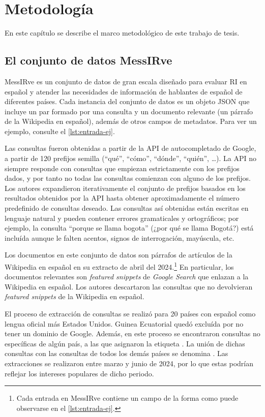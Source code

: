 \chapter{Metodología}\label{cap:metodologia}

En este capítulo se describe el marco metodológico de este trabajo de tesis.

\section{El conjunto de datos MessIRve}\label{sec:metodologia-dataset}
MessIRve \parencite{messirve-ValentiniEtAl2025} es un conjunto de datos de gran escala diseñado para evaluar RI en español y atender las necesidades de información de hablantes de español de diferentes países. Cada instancia del conjunto de datos es un objeto JSON que incluye un par formado por una consulta y un documento relevante (un párrafo de la Wikipedia en español), además de otros campos de metadatos. Para ver un ejemplo, consulte el \cref{lst:entrada-ej}.

Las consultas fueron obtenidas a partir de la API de autocompletado de Google, a partir de 120 prefijos semilla (``qué'', ``cómo'', ``dónde'', ``quién'', \ldots). La API no siempre responde con consultas que empiezan estrictamente con los prefijos dados, y por tanto no todas las consultas comienzan con alguno de los prefijos. Los autores expandieron iterativamente el conjunto de prefijos basados en los resultados obtenidos por la API hasta obtener aproximadamente el número predefinido de consultas deseado. Las consultas así obtenidas están escritas en lenguaje natural y pueden contener errores gramaticales y ortográficos; por ejemplo, la consulta ``porque se llama bogota'' (¿por qué se llama Bogotá?) está incluída aunque le falten acentos, signos de interrogación, mayúscula, etc.

Los documentos en este conjunto de datos son párrafos de artículos de la Wikipedia en español en su extracto de abril del 2024.\footnote{Cada entrada en MessIRve contiene un campo  de la forma  como puede observarse en el \cref{lst:entrada-ej}.} En particular, los documentos relevantes son \textit{featured snippets} de \textit{Google Search} que enlazan a la Wikipedia en español. Los autores descartaron las consultas que no devolvieran \textit{featured snippets} de la Wikipedia en español. 

El proceso de extracción de consultas se realizó para 20 países con español como lengua oficial más Estados Unidos. Guinea Ecuatorial quedó excluída por no tener un dominio de Google. Además, en este proceso se encontraron consultas no específicas de algún país, a las que asignaron la etiqueta . La unión de dichas consultas con las consultas de todos los demás países se denomina . Las extracciones se realizaron entre marzo y junio de 2024, por lo que estas podrían reflejar los intereses populares de dicho periodo. 

